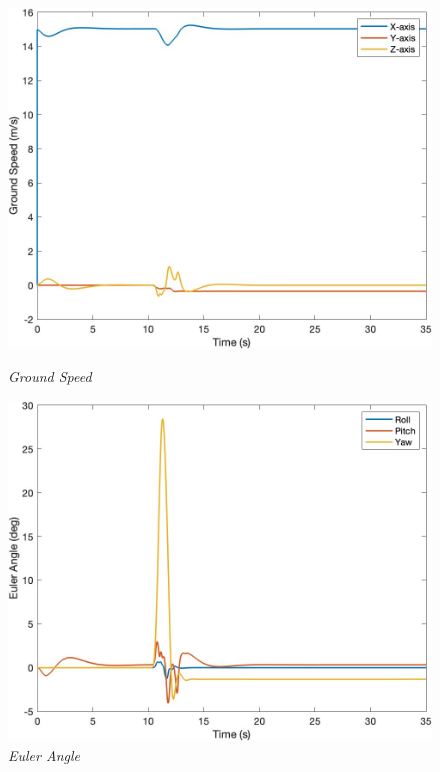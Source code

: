 \begin{figure}[htbp]
  \begin{minipage}[b]{0.45\textwidth}
    \centering
    \includegraphics[width=\textwidth]{Images/Gust/Gust FWD pulse 0428/3 groundspeed_3.jpg}
    \caption*{\textit{Ground Speed}}
  \end{minipage}
  \hfil
  \begin{minipage}[b]{0.45\textwidth}
    \centering
    \includegraphics[width=\textwidth]{Images/Gust/Gust FWD pulse 0428/4 EulerAngle_3.jpg}
    \caption*{\textit{Euler Angle}}
  \end{minipage}
  \begin{minipage}[b]{0.45\textwidth}

\end{minipage}
\end{figure}
